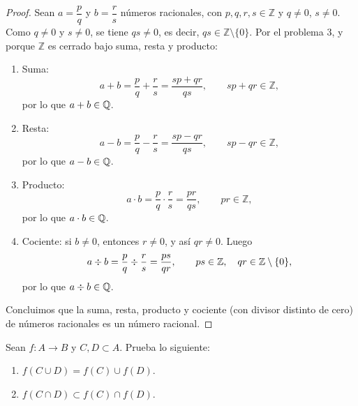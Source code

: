 \documentclass[12pt,a4paper]{article}
\begin{document}
    \begin{proof}
        Sean $a=\dfrac{p}{q}$ y $b=\dfrac{r}{s}$ números racionales, con $p,q,r,s\in\mathbb{Z}$ y $q\neq0$, $s\neq0$. Como $q\neq0$ y $s\neq0$, se tiene $qs\neq0$, es decir, $qs\in\mathbb{Z}\setminus\{0\}$. Por el problema 3, y porque $\mathbb{Z}$ es cerrado bajo suma, resta y producto:
        \begin{enumerate}
            \item[(a)] Suma:
            \begin{equation*}
                a+b=\frac{p}{q}+\frac{r}{s}=\frac{sp+qr}{qs},\qquad sp+qr\in\mathbb{Z},
            \end{equation*}
            por lo que $a+b\in\mathbb{Q}$.
            \item[(b)] Resta:
            \begin{equation*}
                a-b=\frac{p}{q}-\frac{r}{s}=\frac{sp-qr}{qs},\qquad sp-qr\in\mathbb{Z},
            \end{equation*}
            por lo que $a-b\in\mathbb{Q}$.
            \item[(c)] Producto:
            \begin{equation*}
                a\cdot b=\frac{p}{q}\cdot\frac{r}{s}=\frac{pr}{qs},\qquad pr\in\mathbb{Z},
            \end{equation*}
            por lo que $a\cdot b\in\mathbb{Q}$.
            \item[(d)] Cociente: si $b\neq0$, entonces $r\neq0$, y así $qr\neq0$. Luego
            \begin{equation*}
                a\mathbin{\divisionsymbol}b=\frac{p}{q}\mathbin{\divisionsymbol}\frac{r}{s}=\frac{ps}{qr},\qquad ps\in\mathbb{Z},\quad qr\in\mathbb{Z}\setminus\{0\},
            \end{equation*}
            por lo que $a\mathbin{\divisionsymbol}b\in\Q$.
        \end{enumerate}
        Concluimos que la suma, resta, producto y cociente (con divisor distinto de cero) de números racionales es un número racional.
    \end{proof}

    \begin{problema}
        Sean $f:A\to B$ y $C,D\subset A$. Prueba lo siguiente:
        \begin{enumerate}
            \item[(a)] $f(C\cup D)=f(C)\cup f(D).$
            \item[(b)] $f(C\cap D)\subset f(C)\cap f(D).$
        \end{enumerate}
    \end{problema}
\end{document}
